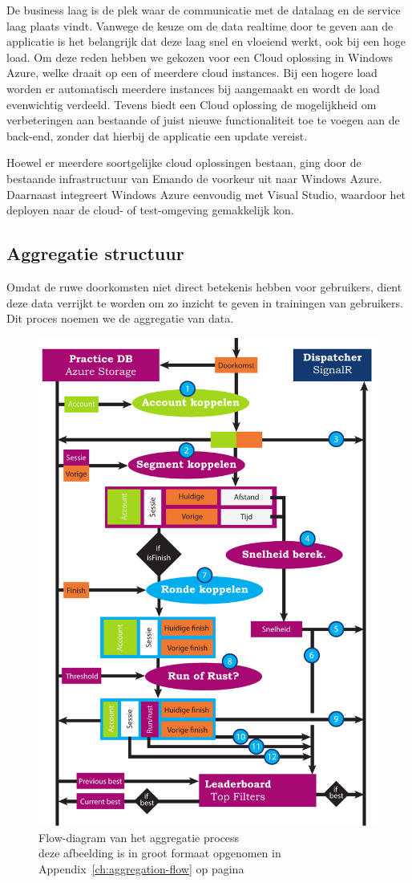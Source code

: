 De business laag is de plek waar de communicatie met de datalaag en de service laag plaats vindt. Vanwege de keuze om de data realtime door te geven aan de applicatie is het belangrijk dat deze laag snel en vloeiend werkt, ook bij een hoge load. Om deze reden hebben we gekozen voor een Cloud oplossing in Windows Azure, welke draait op een of meerdere cloud instances. Bij een hogere load worden er automatisch meerdere instances bij aangemaakt en wordt de load evenwichtig verdeeld. Tevens biedt een Cloud oplossing de mogelijkheid om verbeteringen aan bestaande of juist nieuwe functionaliteit toe te voegen aan de back-end, zonder dat hierbij de applicatie een update vereist.

Hoewel er meerdere soortgelijke cloud oplossingen bestaan, ging door de bestaande infrastructuur van Emando de voorkeur uit naar Windows Azure. Daarnaast integreert Windows Azure eenvoudig met Visual Studio, waardoor het deployen naar de cloud- of test-omgeving gemakkelijk kon.

\subsection{Aggregatie structuur}
Omdat de ruwe doorkomsten niet direct betekenis hebben voor gebruikers, dient deze data verrijkt te worden om zo inzicht te geven in trainingen van gebruikers. Dit proces noemen we de aggregatie van data.

\begin{figure}
  \begin{center}
    \includegraphics[width=.4\textwidth]{style/images/Aggregatie-flow}
  \end{center}
  \caption{Flow-diagram van het aggregatie process \\ deze afbeelding is in groot formaat opgenomen in Appendix~\ref{ch:aggregation-flow} op pagina~\pageref{fig:aggregatie-flow-large}}
  \label{fig:aggregatie-flow}
\end{figure}

